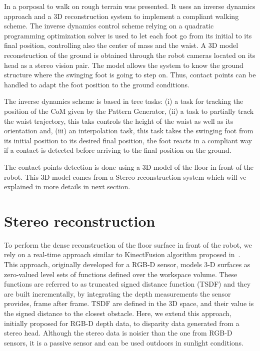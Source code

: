 In \citep{RamosIJHR2013} a porposal to walk on rough terrain was presented. It uses an inverse dynamics approach and a 3D reconstruction system to implement a compliant walking scheme. The inverse dynamics control scheme relying on a quadratic programming optimization solver is used to let each foot go from its initial to its final position, controlling also the center of mass and the waist. A 3D model reconstruction of the ground is obtained through the robot cameras located on its head as a stereo vision pair. The model allows the system to know the ground structure where the swinging foot is going to step on. Thus, contact points can be handled to adapt the foot position to the ground conditions.

The inverse dynamics scheme is based in tree tasks: (i) a task for tracking the position of the CoM given by the Pattern Generator, (ii) a task to partially track the waist trajectory, this taks controls the height of the waist as well as its orientation and, (iii) an interpolation task, this task takes the swinging foot from its initial position to its desired final position, the foot reacts in a compliant way if a contact is detected before arriving to the final position on the ground.

The contact points detection is done using a 3D model of the floor in front of the robot. This 3D model comes from a Stereo reconstruction system which will ve explained in more details in next section.

\section{Stereo reconstruction}

To perform the dense reconstruction of the floor surface in front of the robot, we rely on a real-time approach similar to KinectFusion algorithm proposed in~\citep{Newcombe2011}. This approach, originally developed for a RGB-D sensor, models 3-D surfaces as zero-valued level sets of functions defined over the workspace volume. These functions are referred to as truncated signed distance function (TSDF) and they are built incrementally, by integrating the depth measurements the sensor provides, frame after frame. TSDF are defined in the 3D space, and their value is the signed distance to the closest obstacle. Here, we extend this approach, initially proposed for RGB-D depth data, to disparity data generated from a stereo head. Although the stereo data is noisier than the one from RGB-D sensors, it is a passive sensor and can be used outdoors in sunlight conditions.


